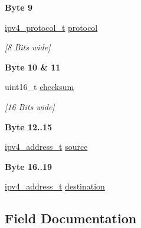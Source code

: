 \begin{Indent}\textbf{ Byte 9}\par
\begin{DoxyCompactItemize}
\item 
\mbox{\hyperlink{group__ipv4_gaf689af7304e282d1606e70bf56cbc3d4}{ipv4\+\_\+protocol\+\_\+t}} \mbox{\hyperlink{structipv4__header_a7de5f6a405a2303535b5d9ce543854ab}{protocol}}
\begin{DoxyCompactList}\small\item\em \mbox{[}8 Bits wide\mbox{]} \end{DoxyCompactList}\end{DoxyCompactItemize}
\end{Indent}
\begin{Indent}\textbf{ Byte 10 \& 11}\par
\begin{DoxyCompactItemize}
\item 
uint16\+\_\+t \mbox{\hyperlink{structipv4__header_a6796c847bbd16253ce2538754c250bd6}{checksum}}
\begin{DoxyCompactList}\small\item\em \mbox{[}16 Bits wide\mbox{]} \end{DoxyCompactList}\end{DoxyCompactItemize}
\end{Indent}
\begin{Indent}\textbf{ Byte 12..15}\par
\begin{DoxyCompactItemize}
\item 
\mbox{\hyperlink{group__ipv4_gad9df0882950e70d0587a4b423beb261a}{ipv4\+\_\+address\+\_\+t}} \mbox{\hyperlink{structipv4__header_af8fb03a8846d0d2ee53e316a7d548a8f}{source}}
\end{DoxyCompactItemize}
\end{Indent}
\begin{Indent}\textbf{ Byte 16..19}\par
\begin{DoxyCompactItemize}
\item 
\mbox{\hyperlink{group__ipv4_gad9df0882950e70d0587a4b423beb261a}{ipv4\+\_\+address\+\_\+t}} \mbox{\hyperlink{structipv4__header_af22742f606b58c8db77e85c968629914}{destination}}
\end{DoxyCompactItemize}
\end{Indent}


\subsection{Field Documentation}
\mbox{\label{structipv4__header_a6796c847bbd16253ce2538754c250bd6}} 
